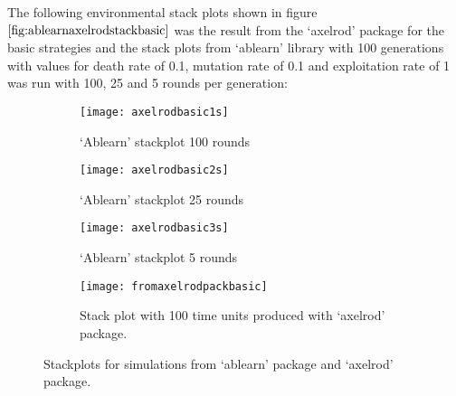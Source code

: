 \begin{table}[H]
\begin{center}
\end{center}
\caption{`Axelrod' package payoff bimatrix for basic strategies.}
\label{tab:axelrodbasicmatrix}
\end{table}

The following environmental stack plots shown in figure $\ref{fig:ablearnaxelrodstackbasic}$ was the result from the `axelrod' package for the basic strategies and the stack plots from `ablearn' library with 100 generations with values for death rate of 0.1, mutation rate of 0.1 and exploitation rate of 1 was run with 100, 25 and 5 rounds per generation:

\begin{figure}[H]       
    \centering
    \begin{subfigure}[b]{0.4\textwidth}
	\centering
	{\texttt{[image: axelrodbasic1s]}}   
    	\caption{`Ablearn' stackplot 100 rounds}
	\label{fig:axlbasic100rpgs}
    \end{subfigure}
    \hfill
    \begin{subfigure}[b]{0.4\textwidth}
	\centering
	{\texttt{[image: axelrodbasic2s]}}   
    	\caption{`Ablearn' stackplot 25 rounds}
	\label{fig:axlbasic25rpgs}
    \end{subfigure}
    \hfill
    \begin{subfigure}[b]{0.4\textwidth}
	\centering
	{\texttt{[image: axelrodbasic3s]}}   
    	\caption{`Ablearn' stackplot 5 rounds}
	\label{fig:axlbasic5rpgs}
    \end{subfigure}
    \hfill
    \begin{subfigure}[b]{0.4\textwidth}
	\centering
	{\texttt{[image: fromaxelrodpackbasic]}}   
	\caption{Stack plot with 100 time units produced with `axelrod' package.}
	\label{fig:axelrodbasicstack100}
    \end{subfigure}
    \caption{Stackplots for simulations from `ablearn' package and `axelrod' package.}
    \label{fig:ablearnaxelrodstackbasic}
\end{figure}


